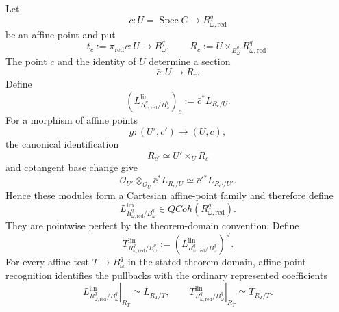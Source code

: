 \begin{construction}
\label{constr:symmetry-noether-affine-point-reduced-cotangent-and-tangent-coefficients}
Let
\[
c:U=\operatorname{Spec}C\longrightarrow
R_{\omega,\mathrm{red}}^{q}
\]
be an affine point and put
\[
t_c:=\pi_{\mathrm{red}}c:
U\longrightarrow B_\omega^q,
\qquad
R_c:=
U\times_{B_\omega^q}R_{\omega,\mathrm{red}}^{q}.
\]
The point $c$ and the identity of $U$ determine a section
\[
\bar c:U\longrightarrow R_c.
\]
Define
\[
\boxed{
\left(
L_{R_{\omega,\mathrm{red}}^{q}/B_\omega^q}^{\mathrm{lin}}
\right)_c
:=
\bar c^*L_{R_c/U}.
}
\]
For a morphism of affine points
\[
g:(U',c')\longrightarrow(U,c),
\]
the canonical identification
\[
R_{c'}\simeq U'\times_UR_c
\]
and cotangent base change give
\[
\mathcal O_{U'}\otimes_{\mathcal O_U}
\bar c^*L_{R_c/U}
\simeq
\bar c'{}^*L_{R_{c'}/U'}.
\]
Hence these modules form a Cartesian affine-point family and therefore define
\[
\boxed{
L_{R_{\omega,\mathrm{red}}^{q}/B_\omega^q}^{\mathrm{lin}}
\in
QCoh(R_{\omega,\mathrm{red}}^{q}).
}
\]
They are pointwise perfect by the theorem-domain convention.  Define
\[
\boxed{
T_{R_{\omega,\mathrm{red}}^{q}/B_\omega^q}^{\mathrm{lin}}
:=
\left(
L_{R_{\omega,\mathrm{red}}^{q}/B_\omega^q}^{\mathrm{lin}}
\right)^\vee.
}
\]
For every affine test $T\to B_\omega^q$ in the stated theorem domain, affine-point
recognition identifies the pullbacks with the ordinary represented coefficients
\[
\left.
L_{R_{\omega,\mathrm{red}}^{q}/B_\omega^q}^{\mathrm{lin}}
\right|_{R_T}
\simeq
L_{R_T/T},
\qquad
\left.
T_{R_{\omega,\mathrm{red}}^{q}/B_\omega^q}^{\mathrm{lin}}
\right|_{R_T}
\simeq
T_{R_T/T}.
\]
\end{construction}

